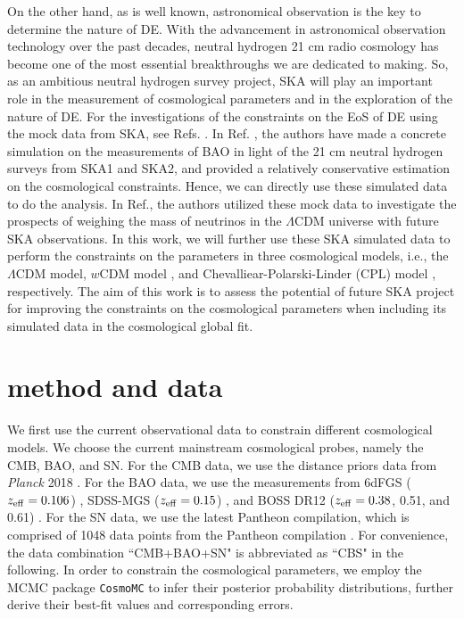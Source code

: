 \documentclass[aps,prd,amsmath,amssymb,showpacs,floats,floatfix,nofootinbib,reprint]{revtex4-1}
\begin{document}
On the other hand, as is well known, astronomical observation is the key to determine the nature of DE. With the advancement in astronomical observation technology over the past decades, neutral hydrogen 21 cm radio cosmology has become one of the most essential breakthroughs we are dedicated to making. So, as an ambitious neutral hydrogen survey project, SKA will play an important role in the measurement of cosmological parameters and in the exploration of the nature of DE. For the investigations of the constraints on the EoS of DE using the mock data from SKA, see Refs. \cite{Bacon:2018dui,Bull:2015nra,Raccanelli:2015qqa,Zhao:2015wqa,Li:2019loh,Zhang:2019ipd}. In Ref. \cite{Bull:2015nra}, the authors have made a concrete simulation on the measurements of BAO in light of the 21 cm neutral hydrogen surveys from SKA1 and SKA2, and provided a relatively conservative estimation on the cosmological constraints. Hence, we can directly use these simulated data to do the analysis. In Ref.\;\cite{Zhang:2019ipd}, the authors utilized these mock data to investigate the prospects of weighing the mass of neutrinos in the $\Lambda$CDM universe with future SKA observations. In this work, we will further use these SKA simulated data to perform the constraints on the parameters in three cosmological models, i.e., the $\Lambda$CDM model, $w$CDM model \cite{Zlatev:1998tr,Steinhardt:1999nw,Mendoza:2005jk,Zhang:2005rj}, and Chevalliear-Polarski-Linder (CPL) model \cite{Chevallier:2000qy,Linder:2002et}, respectively. 
The aim of this work is to assess the potential of future SKA project for improving the constraints on the cosmological parameters when including its simulated data in the cosmological global fit.
\section{method and data}
We first {use} the current observational data to constrain different cosmological models. We choose the current mainstream cosmological probes, namely the CMB, BAO, and SN. For the CMB data, we use the distance priors data from {\it Planck} 2018 \cite{Aghanim:2018eyx,Chen:2018dbv}. For the BAO data, we use the measurements from 6dFGS ($z_{\rm eff}=0.106$) \cite{Beutler:2011hx}, SDSS-MGS ($z_{\rm eff}=0.15$) \cite{Ross:2014qpa}, and BOSS DR12 ($z_{\rm eff}=0.38$, 0.51, and 0.61) \cite{Alam:2016hwk}. For the SN data, we use the latest Pantheon compilation, which is comprised of 1048 data points from the Pantheon compilation \cite{Scolnic:2017caz}. For convenience, the data combination ``CMB+BAO+SN" is abbreviated as ``CBS" in the following.
In order to constrain the cosmological parameters, we employ the MCMC package {\tt CosmoMC} \cite{Lewis:2002ah} to infer their posterior probability distributions, further derive their best-fit values and corresponding errors.
\end{document}
